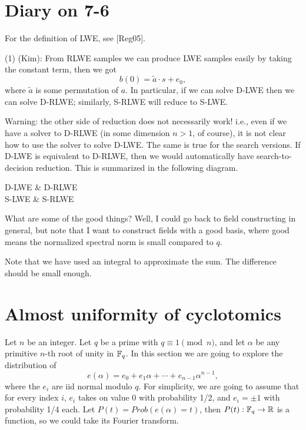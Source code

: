 \documentclass{amsart}
\begin{document}
\section{Diary on 7-6}

For the definition of LWE, see [Reg05].

(1) (Kim): From RLWE samples we can produce LWE samples easily by taking the constant term, then we got
\[
    b(0) = \tilde{a} \cdot s  + e_0,
\]
where $\tilde{a}$ is some permutation of $a$. In particular,
if we can solve D-LWE then we can solve D-RLWE; similarly,
S-RLWE will reduce to S-LWE.

Warning: the other side of reduction does not necessarily work! i.e., even if we have a solver to D-RLWE (in some dimension $n > 1$, of course), it is not clear how to use the solver to solve D-LWE. The same is true for the search versions. If D-LWE is equivalent to D-RLWE, then we would automatically have search-to-decision reduction. This is summarized in the following diagram.

\begin{cd}
D-LWE \arrow[r, Rightarrow] \arrow[d, "Reg05"] & D-RLWE  \\
S-LWE \arrow[r,Rightarrow] & S-RLWE
\end{cd}

What are some of the good things? Well, I could go back to field constructing in general, but note that I want to
construct fields with a good basis, where good means the normalized spectral norm is small compared to $q$.


Note that we have used an integral to approximate the sum.
The difference should be small enough.



\section{Almost uniformity of cyclotomics}

Let $n$ be an integer. Let $q$ be a prime with $q \equiv 1 \pmod{n}$, and let $\alpha$ be any primitive $n$-th root of unity in $\mathbb{F}_q$. In this section we are going to explore the distribution of
\[
    e(\alpha) = e_0 + e_1 \alpha + \cdots + e_{n-1} \alpha^{n-1},
\]
where the $e_i$ are iid normal modulo $q$. For simplicity,
we are going to assume that for every index $i$, $e_i$ takes on value 0 with probability 1/2, and $e_i = \pm 1$ with probability 1/4 each. Let $P(t) = Prob(e(\alpha) = t)$, then $P(t): \mathbb{F}_q \to \mathbb{R}$ is a function, so we could take its Fourier transform.
\end{document}
